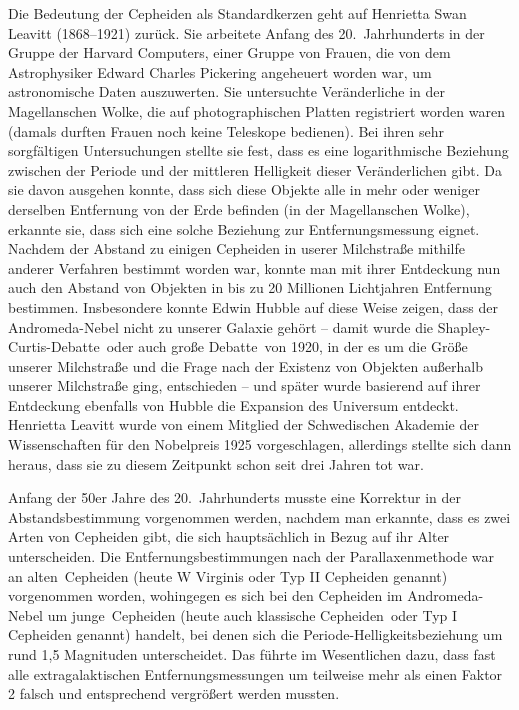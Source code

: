 Die Bedeutung der Cepheiden als Standardkerzen geht auf 
Henrietta Swan Leavitt (1868--1921) zur\"uck.
Sie arbeitete Anfang des 20.\ Jahrhunderts in der Gruppe der \glqq Harvard Computers\grqq, einer Gruppe
von Frauen, die von dem Astrophysiker Edward Charles Pickering angeheuert worden war, um 
astronomische Daten auszuwerten. Sie untersuchte Ver\"anderliche in der Magellanschen Wolke, die
auf photographischen Platten registriert worden waren (damals durften Frauen noch keine Teleskope bedienen). 
Bei ihren sehr sorgf\"altigen Untersuchungen stellte sie fest, dass es eine logarithmische Beziehung
zwischen der Periode und der mittleren Helligkeit dieser Ver\"anderlichen gibt. Da sie davon ausgehen
konnte, dass sich diese Objekte alle in mehr oder weniger derselben Entfernung von der Erde
befinden (in der Magellanschen Wolke), erkannte sie, dass sich eine solche Beziehung zur Entfernungsmessung
eignet. Nachdem der Abstand zu einigen Cepheiden in userer Milchstra\ss e mithilfe anderer Verfahren
bestimmt worden war, konnte man mit
ihrer Entdeckung nun auch den Abstand von Objekten in bis zu 20 Millionen Lichtjahren Entfernung
bestimmen. Insbesondere konnte Edwin Hubble auf diese Weise zeigen, dass der
Andromeda-Nebel nicht zu unserer Galaxie geh\"ort -- damit wurde die \glqq Shapley-Curtis-Debatte\grqq\ oder
auch \grqq gro\ss e Debatte\grqq\ von 1920, in der es um die Gr\"o\ss e unserer Milchstra\ss e und die
Frage nach der Existenz von Objekten au\ss erhalb unserer Milchstra\ss e ging, entschieden -- und sp\"ater wurde 
basierend auf ihrer Entdeckung ebenfalls von Hubble die Expansion des Universum entdeckt. 
Henrietta Leavitt wurde von einem Mitglied der Schwedischen Akademie der 
Wissenschaften f\"ur den Nobelpreis 1925 vorgeschlagen, allerdings stellte sich dann heraus, dass sie
zu diesem Zeitpunkt schon seit drei Jahren tot war.  

Anfang der 50er Jahre des 20.\ Jahrhunderts musste eine Korrektur in der Abstandsbestimmung
vorgenommen werden, nachdem man erkannte, dass es zwei Arten von Cepheiden gibt, die sich
haupts\"achlich in Bezug auf ihr Alter unterscheiden. Die Entfernungsbestimmungen nach der 
Parallaxenmethode war an \glqq alten\grqq\ Cepheiden (heute W Virginis oder Typ II Cepheiden genannt) 
vorgenommen worden, wohingegen
es sich bei den Cepheiden im Andromeda-Nebel um \glqq junge\grqq\ Cepheiden (heute auch
\glqq klassische Cepheiden\grqq\ oder Typ I Cepheiden genannt) handelt, bei denen sich
die Periode-Helligkeitsbeziehung um rund 1,5 Magnituden unterscheidet. Das f\"uhrte im Wesentlichen
dazu, dass fast alle extragalaktischen Entfernungsmessungen um teilweise mehr als einen Faktor 2 falsch und entsprechend
vergr\"o\ss ert werden mussten.  

